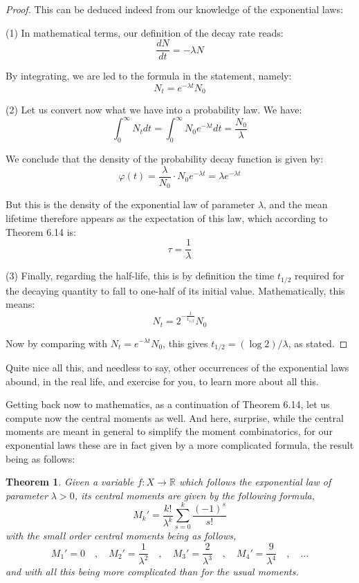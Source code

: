 \documentclass[12pt]{amsbook}
\newtheorem{theorem}{Theorem}[chapter]
\begin{document}
\begin{proof}
This can be deduced indeed from our knowledge of the exponential laws:

\medskip

(1) In mathematical terms, our definition of the decay rate reads:
$$\frac{dN}{dt}=-\lambda N$$

By integrating, we are led to the formula in the statement, namely:
$$N_t=e^{-\lambda t}N_0$$

(2) Let us convert now what we have into a probability law. We have:
$$\int_0^\infty N_tdt=\int_0^\infty N_0e^{-\lambda t}dt=\frac{N_0}{\lambda}$$

We conclude that the density of the probability decay function is given by:
$$\varphi(t)=\frac{\lambda}{N_0}\cdot N_0e^{-\lambda t}=\lambda e^{-\lambda t}$$

But this is the density of the exponential law of parameter $\lambda$, and the mean lifetime therefore appears as the expectation of this law, which according to Theorem 6.14 is:
$$\tau=\frac{1}{\lambda}$$

(3) Finally, regarding the half-life, this is by definition the time $t_{1/2}$ required for the decaying quantity to fall to one-half of its initial value. Mathematically, this means:
$$N_t=2^{-\frac{t}{t_{1/2}}}N_0$$

Now by comparing with $N_t=e^{-\lambda t}N_0$, this gives $t_{1/2}=(\log 2)/\lambda$, as stated.
\end{proof}

Quite nice all this, and needless to say, other occurrences of the exponential laws abound, in the real life, and exercise for you, to learn more about all this. 

\bigskip

Getting back now to mathematics, as a continuation of Theorem 6.14, let us compute now the central moments as well. And here, surprise, while the central moments are meant in general to simplify the moment combinatorics, for our exponential laws these are in fact given by a more complicated formula, the result being as follows:

\begin{theorem}
Given a variable $f:X\to\mathbb R$ which follows the exponential law of parameter $\lambda>0$, its central moments are given by the following formula,
$$M_k'=\frac{k!}{\lambda^k}\sum_{s=0}^k\frac{(-1)^s}{s!}$$
with the small order central moments being as follows,
$$M_1'=0\quad,\quad 
M_2'=\frac{1}{\lambda^2}\quad,\quad
M_3'=\frac{2}{\lambda^3}\quad,\quad
M_4'=\frac{9}{\lambda^4}\quad,\quad\ldots$$
and with all this being more complicated than for the usual moments.
\end{theorem}
\end{document}
